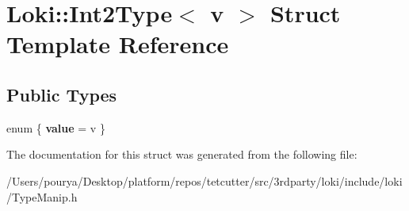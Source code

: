 \hypertarget{structLoki_1_1Int2Type}{}\section{Loki\+:\+:Int2\+Type$<$ v $>$ Struct Template Reference}
\label{structLoki_1_1Int2Type}
\subsection*{Public Types}
\begin{DoxyCompactItemize}
\item 
\hypertarget{structLoki_1_1Int2Type_a66279b2188890e06eab579266beb3c9c}{}enum \{ {\bfseries value} = v
 \}\label{structLoki_1_1Int2Type_a66279b2188890e06eab579266beb3c9c}

\end{DoxyCompactItemize}


The documentation for this struct was generated from the following file\+:\begin{DoxyCompactItemize}
\item 
/\+Users/pourya/\+Desktop/platform/repos/tetcutter/src/3rdparty/loki/include/loki/Type\+Manip.\+h\end{DoxyCompactItemize}

